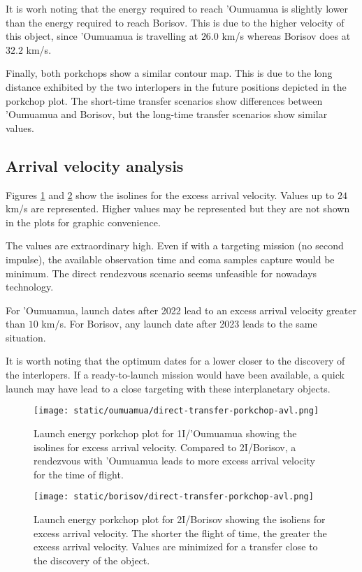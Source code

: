 It is worh noting that the energy required to reach 'Oumuamua is slightly lower
than the energy required to reach Borisov. This is due to the higher velocity of
this object, since 'Oumuamua is travelling at $26.0$ km/s whereas Borisov does
at $32.2$ km/s.

Finally, both porkchops show a similar contour map. This is due to the long
distance exhibited by the two interlopers in the future positions depicted in
the porkchop plot. The short-time transfer scenarios show differences between
'Oumuamua and Borisov, but the long-time transfer scenarios show similar values.

\subsection{Arrival velocity analysis}

Figures \ref{fig:oumuamua-direct-transfer-porkchop-avl} and
\ref{fig:borisov-direct-transfer-porkchop-avl} show the isolines for the excess
arrival velocity. Values up to $24$ km/s are represented. Higher values may be
represented but they are not shown in the plots for graphic convenience.

The values are extraordinary high. Even if with a targeting mission (no second
impulse), the available observation time and coma samples capture would be
minimum. The direct rendezvous scenario seems unfeasible for nowadays
technology.

For 'Oumuamua, launch dates after 2022 lead to an excess arrival velocity
greater than $10$ km/s. For Borisov, any launch date after 2023 leads to the same
situation.

It is worth noting that the optimum dates for a lower closer to the discovery of
the interlopers. If a ready-to-launch mission would have been available, a quick
launch may have lead to a close targeting with these interplanetary objects.

\newpage
\begin{figure}[H]
  \centering
  \texttt{[image: static/oumuamua/direct-transfer-porkchop-avl.png]}
  \caption{Launch energy porkchop plot for 1I/'Oumuamua showing the isolines for
        excess arrival velocity. Compared to 2I/Borisov, a rendezvous with
        'Oumuamua leads to more excess arrival velocity for the time of flight.}
  \label{fig:oumuamua-direct-transfer-porkchop-avl}
\end{figure}
\begin{figure}[H]
  \centering
  \texttt{[image: static/borisov/direct-transfer-porkchop-avl.png]}
  \caption{Launch energy porkchop plot for 2I/Borisov showing the isoliens for
        excess arrival velocity. The shorter the flight of time, the greater the
        excess arrival velocity. Values are minimized for a transfer close to
        the discovery of the object.}
  \label{fig:borisov-direct-transfer-porkchop-avl}
\end{figure}
\newpage

